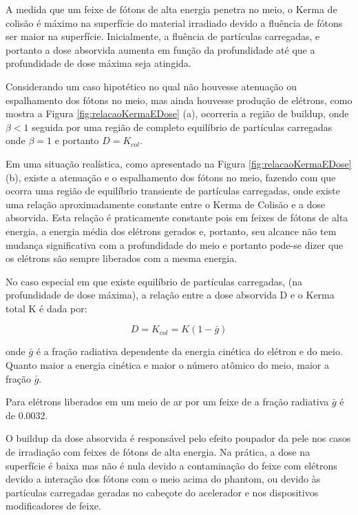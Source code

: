 \documentclass[11pt,a4paper]{article}
\newcounter{exemplo}
\begin{document}
		A medida que um feixe de fótons de alta energia penetra no meio, o Kerma de colisão é máximo na superfície do material irradiado devido a fluência de fótons ser maior na superfície. Inicialmente, a fluência de partículas carregadas, e portanto a dose absorvida aumenta em função da profundidade até que a profundidade de dose máxima seja atingida.

		Considerando um caso hipotético no qual não houvesse atenuação ou espalhamento dos fótons no meio, mas ainda houvesse produção de elétrons, como mostra a Figura \ref{fig:relacaoKermaEDose} (a), ocorreria a região de buildup, onde $\beta < 1$ seguida por uma região de completo equilíbrio de partículas carregadas onde $\beta = 1$ e portanto $D = K_{col}$.

		Em uma situação realística, como apresentado na Figura \ref{fig:relacaoKermaEDose} (b), existe a atenuação e o espalhamento dos fótons no meio, fazendo com que ocorra uma região de equilíbrio transiente de partículas carregadas, onde existe uma relação aproximadamente constante entre o Kerma de Colisão e a dose absorvida. Esta relação é praticamente constante pois em feixes de fótons de alta energia, a energia média dos elétrons gerados e, portanto, seu alcance não tem mudança significativa com a profundidade do meio e portanto pode-se dizer que os elétrons são sempre liberados com a mesma energia.

		No caso especial em que existe equilíbrio de partículas carregadas, (na profundidade de dose máxima), a relação entre a dose absorvida D e o Kerma total K é dada por:

			\begin{equation}
				D = K_{col} = K(1 - \bar{g})
			\end{equation}

		\noindent onde $\bar{g}$ é a fração radiativa dependente da energia cinética do elétron e do meio. Quanto maior a energia cinética e maior o número atômico do meio, maior a fração $\bar{g}$.

		\begin{exemplo}[Exemplo]
			Para elétrons liberados em um meio de ar por um feixe de  a fração radiativa $\bar{g}$ é de 0.0032.
		\end{exemplo}

		O buildup da dose absorvida é responsável pelo efeito poupador da pele nos casos de irradiação com feixes de fótons de alta energia. Na prática, a dose na superfície é baixa mas não é nula devido a contaminação do feixe com elétrons devido a interação dos fótons com o meio acima do phantom, ou devido às partículas carregadas geradas no cabeçote do acelerador e nos dispositivos modificadores de feixe.
\end{document}
